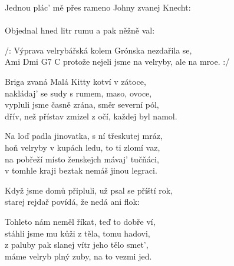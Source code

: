 
\ve{}
Jednou plác' mě přes rameno Johny zvanej Knecht:\\
\\
Objednal hned litr rumu a pak něžně val:\\

\cho{}
/: Výprava velrybářská kolem Grónska nezdařila se,\\
Ami Dmi G7 C
protože nejeli jsme na velryby, ale na mroe. :/

\ve{}
Briga zvaná Malá Kitty kotví v zátoce,\\
nakládaj’ se sudy s rumem, maso, ovoce,\\
vypluli jsme časně zrána, směr severní pól,\\
dřív, než přístav zmizel z očí, každej byl namol.

\cho{}

\ve{}
Na loď padla jinovatka, s ní třeskutej mráz,\\
hoň velryby v kupách ledu, to ti zlomí vaz,\\
na pobřeží místo ženskejch mávaj' tučňáci,\\
v tomhle kraji beztak nemáš jinou legraci.

\cho{}

\ve{}
Když jsme domů připluli, už psal se příští rok,\\
starej rejdař povídá, že nedá ani flok:\\

\cho{}

\ve{}
Tohleto nám neměl říkat, teď to dobře ví,\\
stáhli jsme mu kůži z těla, tomu hadovi,\\
z paluby pak slanej vítr jeho tělo smet',\\
máme velryb plný zuby, na to vezmi jed.

\cho{}

\esong